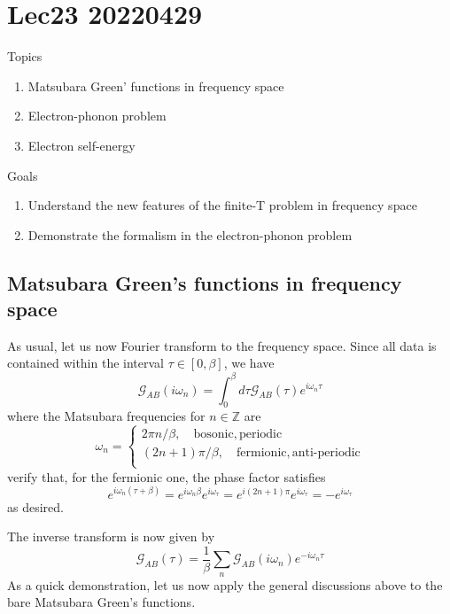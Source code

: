 \chapter{Lec23 20220429}

Topics

\begin{enumerate}
    \item Matsubara Green' functions in frequency space
    \item Electron-phonon problem
    \item Electron self-energy
\end{enumerate}

Goals

\begin{enumerate}
    \item Understand the new features of the finite-T problem in frequency space
    \item Demonstrate the formalism in the electron-phonon problem
\end{enumerate}

\section{Matsubara Green's functions in frequency space}

As usual, let us now Fourier transform to the frequency space. Since all data is contained within the interval $\tau \in \left[ 0,\beta \right]$, we have
\[ \mathcal{G} _{AB}\left( i\omega _n \right) =\int_0^{\beta}{d\tau \mathcal{G} _{AB}\left( \tau \right) e^{i\omega _n\tau}}\]
where the Matsubara frequencies for $n\in\mathbb{Z}$ are
\[ \omega _n=\begin{cases}
	2\pi n/\beta ,\quad \mathrm{bosonic}, \mathrm{periodic}\\
	\left( 2n+1 \right) \pi /\beta ,\quad \mathrm{fermionic},\text{anti-periodic}\\
\end{cases}\]
verify that, for the fermionic one, the phase factor satisfies
\[ e^{i\omega _n\left( \tau +\beta \right)}=e^{i\omega _n\beta}e^{i\omega _{\tau}}=e^{i\left( 2n+1 \right) \pi}e^{i\omega _{\tau}}=-e^{i\omega _{\tau}}\]
as desired.

The inverse transform is now given by
\[ \mathcal{G} _{AB}\left( \tau \right) =\frac{1}{\beta}\sum_n{\mathcal{G} _{AB}\left( i\omega _n \right) e^{-i\omega _n\tau}}\]
As a quick demonstration, let us now apply the general discussions above to the bare Matsubara Green's functions.

